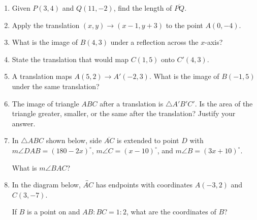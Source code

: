 \documentclass[12pt, twoside]{article}
\begin{document}
\begin{enumerate}
    \item Given $P(3,4)$ and $Q(11,-2)$, find the length of $\overline{PQ}$.
        \vspace{4cm}

    \item Apply the translation $(x,y) \rightarrow (x-1,y+3)$ to the point $A(0,-4)$. \vspace{1cm}
    \item What is the image of $B(4,3)$ under a reflection across the $x$-axis? \vspace{1cm}
    \item State the translation that would map $C(1,5)$ onto $C'(4,3)$. \vspace{1cm}


    \item A translation maps $A(5,2) \rightarrow A'(-2,3)$. What is the image of $B(-1,5)$ under the same translation?  \vspace{0.5cm}

    \item The image of triangle $ABC$ after a translation is $\triangle A'B'C'$. Is the area of the triangle greater, smaller, or the same after the translation? Justify your answer.

\newpage

    \item In  $\triangle ABC$ shown below, side $\overline{AC}$ is extended to point $D$ with $m\angle DAB=(180-2x)^\circ$, $m\angle C=(x-10)^\circ$, and $m\angle B=(3x+10)^\circ$.
      \begin{center}
      \end{center}
      What is $m\angle BAC$?



  \item In the diagram below, $\overleftrightarrow{AC}$ has endpoints with coordinates $A(-3,2)$ and $C(3, -7)$.
    \begin{center} %
    \end{center}
    If $B$ is a point on  and $AB {:} BC = 1{:}2$,  what  are  the  coordinates of $B$?


\end{enumerate}
\end{document}
